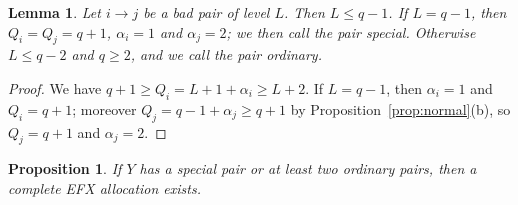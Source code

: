 \documentclass{amsart}
\numberwithin{equation}{section}
\newtheorem{lemma}[theorem]{Lemma}
\newtheorem{proposition}[theorem]{Proposition}
\theoremstyle{definition}
\theoremstyle{remark}
\begin{document}
\begin{lemma}\label{lem:classify}
Let $i\to j$ be a bad pair of level $L$. Then $L\le q-1$. If $L=q-1$, then $Q_i=Q_j=q+1$, $\alpha_i=1$ and $\alpha_j=2$; we then call the pair \emph{special}. Otherwise $L\le q-2$ and $q\ge2$, and we call the pair \emph{ordinary}.
\end{lemma}

\begin{proof}
We have $q+1\ge Q_i=L+1+\alpha_i\ge L+2$. If $L=q-1$, then $\alpha_i=1$ and $Q_i=q+1$; moreover $Q_j=q-1+\alpha_j\ge q+1$ by Proposition~\ref{prop:normal}(b), so $Q_j=q+1$ and $\alpha_j=2$.
\end{proof}

\begin{proposition}\label{prop:several}
If $Y$ has a special pair or at least two ordinary pairs, then a complete EFX allocation exists.
\end{proposition}
\end{document}
